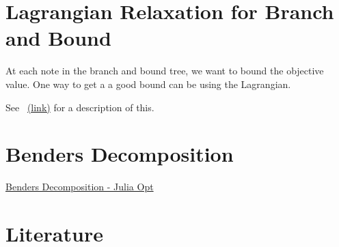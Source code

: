 \documentclass[../open-optimization/open-optimization.tex]{subfiles}
\begin{document}
\section{Lagrangian Relaxation for Branch and Bound}

At each note in the branch and bound tree, we want to bound the objective value.  One way to get a a good bound can be using the Lagrangian. 

See~\cite{Fisher2004}  \href{https://my.eng.utah.edu/~kalla/phy_des/lagrange-relax-tutorial-fisher.pdf}{(link)} for a description of this.



\section{Benders Decomposition}
\href{https://www.juliaopt.org/notebooks/Shuvomoy%20-%20Benders%20decomposition.html}{Benders Decomposition - Julia Opt}

\section{Literature}
\end{document}
